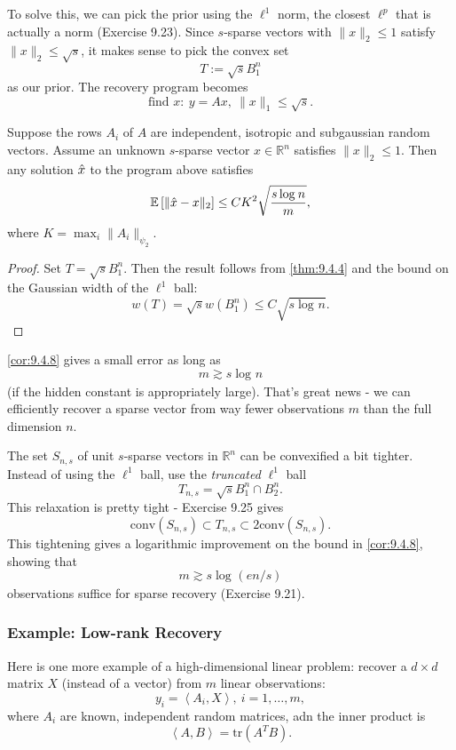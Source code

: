 To solve this, we can pick the prior using the $\ell^1$ norm, the closest $\ell^p$ that is actually a norm 
(Exercise 9.23). Since $s$-sparse vectors with $\lVert x \rVert_{2} \leq 1$ satisfy $\lVert x \rVert_{2} \leq 
\sqrt{s}$, it makes sense to pick the convex set 
\[ T := \sqrt{s}B_1^n \]
as our prior. The recovery program becomes 
\[ \text{find } x: \ y = Ax, \ \lVert x \rVert_{1} \leq \sqrt{s}. \]

\begin{corollary}
\label{cor:9.4.8}
Suppose the rows $A_i$ of $A$ are independent, isotropic and subgaussian random vectors. Assume an unknown 
$s$-sparse vector $x \in \mathbb{R}^n$ satisfies $\lVert x \rVert_{2} \leq 1$. Then any solution $\Hat{x}$ to 
the program above satisfies 
\[ \mathbb{E}\left[ \lVert \Hat{x} - x \rVert_{2} \right] \leq CK^2 \sqrt{\frac{s \log_{}{n}}{m}}, \]
where $K = \max_{i}\lVert A_i \rVert_{\psi_2}$.
\end{corollary}

\begin{proof}
Set $T = \sqrt{s}B_1^n$. Then the result follows from \cref{thm:9.4.4} and the bound on the Gaussian width 
of the $\ell^1$ ball: 
\[ w(T) = \sqrt{s}w(B_1^n) \leq C \sqrt{s \log_{}{n}}. \]
\end{proof}

\begin{remark}
\label{rmk:9.4.9}
\cref{cor:9.4.8} gives a small error as long as
\[ m \gtrsim s \log_{}{n} \]
(if the hidden constant is appropriately large). That's great news - we can efficiently recover a sparse vector 
from way fewer observations $m$ than the full dimension $n$.
\end{remark}

\begin{remark}
\label{rmk:9.4.10}
The set $S_{n, s}$ of unit $s$-sparse vectors in $\mathbb{R}^n$ can be convexified a bit tighter. Instead of 
using the $\ell^1$ ball, use the \textit{truncated} $\ell^1$ ball 
\[ T_{n,s} = \sqrt{s}B_1^n \cap B_2^n. \]
This relaxation is pretty tight - Exercise 9.25 gives 
\[ \mathrm{conv}(S_{n,s}) \subset T_{n,s} \subset 2\mathrm{conv}(S_{n,s}).  \]
This tightening gives a logarithmic improvement on the bound in \cref{cor:9.4.8}, showing that 
\[ m \gtrsim s \log_{}{(en/s)} \]
observations suffice for sparse recovery (Exercise 9.21).
\end{remark}


\subsubsection{Example: Low-rank Recovery}
Here is one more example of a high-dimensional linear problem: recover a $d \times d$ matrix $X$ (instead of 
a vector) from $m$ linear observations:
\[ y_i = \left\langle A_i, X \right\rangle, \ i = 1, \dots, m, \]
where $A_i$ are known, independent random matrices, adn the inner product is 
\[ \left\langle A, B \right\rangle = \mathrm{tr}(A^T B). \]

